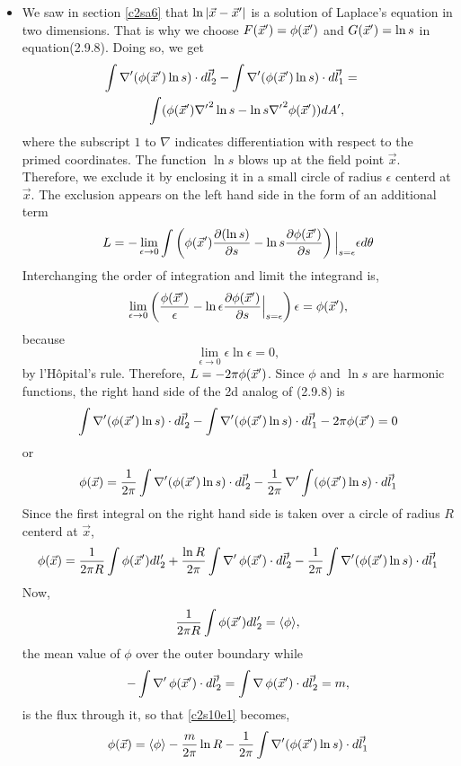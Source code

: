\begin{itemize}
\item We saw in section \ref{c2sa6} that $\ln|\vec{x} - \vec{x}^\prime|$ is a solution of Laplace's equation in two dimensions. That is why we choose $F(\vec{x}^\prime) = \phi(\vec{x}^\prime)$
and $G(\vec{x}^\prime) = \ln s$ in equation(2.9.8). Doing so, we get
\begin{eqnarray*}
\int\operatorname{\nabla}^\prime(\phi(\vec{x}^\prime)\ln s)\cdot d\vec{l}^\prime_2 - \int\operatorname{\nabla}^\prime(\phi(\vec{x}^\prime)\ln s)\cdot d\vec{l}^\prime_1 &=& \\ 
\int(\phi(\vec{x}^\prime){\nabla^\prime}^2\ln s - \ln s {\nabla^\prime}^2\phi(\vec{x}^\prime))dA^\prime, & &
\end{eqnarray*}
where the subscript $1$ to $\nabla$ indicates differentiation with respect to the primed coordinates. The function $\ln s$ blows up at the field point $\vec{x}$. Therefore, we exclude 
it by enclosing it in a small circle of radius $\epsilon$ centerd at $\vec{x}$. The exclusion appears on the left hand side in the form of an additional term
\[
L = -\lim_{\epsilon \rightarrow 0}\int\left(\phi(\vec{x}^\prime)\frac{\partial{(\ln s)}}{\partial{s}} - \ln s\frac{\partial{\phi(\vec{x}^\prime)}}{\partial{s}}\right)\Big|_{s=\epsilon}\epsilon d\theta
\]
Interchanging the order of integration and limit the integrand is,
\[
\lim_{\epsilon \rightarrow 0}\left(\frac{\phi(\vec{x}^\prime)}{\epsilon} - \ln\epsilon\frac{\partial{\phi(\vec{x}^\prime)}}{\partial{s}}\Big|_{s=\epsilon} \right) \epsilon = \phi(\vec{x}^\prime),
\]
because 
\[
\lim_{\epsilon \rightarrow 0}\epsilon\ln\epsilon = 0,
\]
by l'H\^{o}pital's rule. Therefore, $L = -2\pi\phi(\vec{x}^\prime)$. Since $\phi$ and $\ln s$ are harmonic functions, the right hand side of the 2d analog of (2.9.8) is
\[
\int\operatorname{\nabla}^\prime(\phi(\vec{x}^\prime)\ln s)\cdot d\vec{l}^\prime_2 - \int\operatorname{\nabla}^\prime(\phi(\vec{x}^\prime)\ln s)\cdot d\vec{l}^\prime_1 - 2\pi\phi(\vec{x}^\prime) = 0
\]
or
\[
\phi(\vec{x}) = \frac{1}{2\pi}\int\operatorname{\nabla}^\prime(\phi(\vec{x}^\prime)\ln s)\cdot d\vec{l}^\prime_2 - \frac{1}{2\pi}\operatorname{\nabla}^\prime\int(\phi(\vec{x}^\prime)\ln s)\cdot d\vec{l}^\prime_1
\]
Since the first integral on the right hand side is taken over a circle of radius $R$ centerd at $\vec{x}$,
\begin{equation}\label{c2s10e1}
\phi(\vec{x}) = \frac{1}{2\pi R}\int\phi(\vec{x}^\prime)dl^\prime_2 + \frac{\ln R}{2\pi}\int\operatorname{\nabla}^\prime{\phi(\vec{x}^\prime)}\cdot d\vec{l}^\prime_2 - 
\frac{1}{2\pi}\int\operatorname{\nabla}^\prime(\phi(\vec{x}^\prime)\ln s)\cdot d\vec{l}^\prime_1
\end{equation}
Now,
\[
\frac{1}{2\pi R}\int\phi(\vec{x}^\prime)dl^\prime_2  = \langle\phi\rangle,
\]
the mean value of $\phi$ over the outer boundary while
\[
-\int\operatorname{\nabla}^\prime{\phi(\vec{x}^\prime)}\cdot d\vec{l}^\prime_2 = \int\operatorname{\nabla}{\phi(\vec{x}^\prime)}\cdot d\vec{l}^\prime_2 = m,
\]
is the flux through it, so that \eqref{c2s10e1} becomes,
\begin{equation}\label{c2s10e2}
\phi(\vec{x}) = \langle\phi\rangle - \frac{m}{2\pi}\ln R - \frac{1}{2\pi}\int\operatorname{\nabla}^\prime(\phi(\vec{x}^\prime)\ln s)\cdot d\vec{l}^\prime_1
\end{equation}


\end{itemize}
